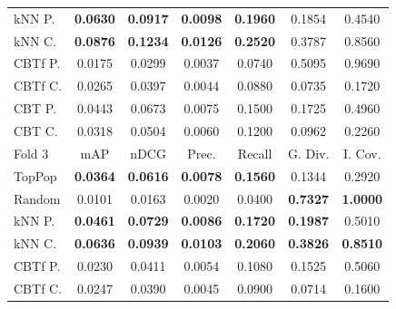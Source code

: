 \begin{table}[hbt]
\begin{tabulary}{\textwidth}{|L|CCCCCC|}
kNN P. & \textbf{0.0630} &  \textbf{0.0917} &  \textbf{0.0098} &  \textbf{0.1960} &                                            0.1854 &                                            0.4540 \\
kNN C. & \textbf{0.0876} &  \textbf{0.1234} &  \textbf{0.0126} &  \textbf{0.2520} &                                            0.3787 &                                            0.8560 \\
CBTf P. & 0.0175 &           0.0299 &           0.0037 &           0.0740 &                                            0.5095 &                                            0.9690 \\
CBTf C. & 0.0265 &           0.0397 &           0.0044 &           0.0880 &                                            0.0735 &                                            0.1720 \\
CBT P. & 0.0443 &           0.0673 &           0.0075 &           0.1500 &                                            0.1725 &                                            0.4960 \\
CBT C. & 0.0318 &           0.0504 &           0.0060 &           0.1200 &                                            0.0962 &                                            0.2260 \\
\hline
\hline
Fold 3 & mAP & nDCG & Prec. & Recall & G. Div. & I. Cov. \\
\hline
TopPop & \textbf{0.0364} &  \textbf{0.0616} &  \textbf{0.0078} &  \textbf{0.1560} &                                            0.1344 &                                            0.2920 \\
Random & 0.0101 &           0.0163 &           0.0020 &           0.0400 &                                   \textbf{0.7327} &                                   \textbf{1.0000} \\
kNN P. & \textbf{0.0461} &  \textbf{0.0729} &  \textbf{0.0086} &  \textbf{0.1720} &                                   \textbf{0.1987} &                                            0.5010 \\
kNN C. & \textbf{0.0636} &  \textbf{0.0939} &  \textbf{0.0103} &  \textbf{0.2060} &                                   \textbf{0.3826} &                                   \textbf{0.8510} \\
CBTf P. & 0.0230 &           0.0411 &           0.0054 &           0.1080 &                                            0.1525 &                                            0.5060 \\
CBTf C. & 0.0247 &           0.0390 &           0.0045 &           0.0900 &                                            0.0714 &                                            0.1600 \\

\end{tabulary}
\end{table}

